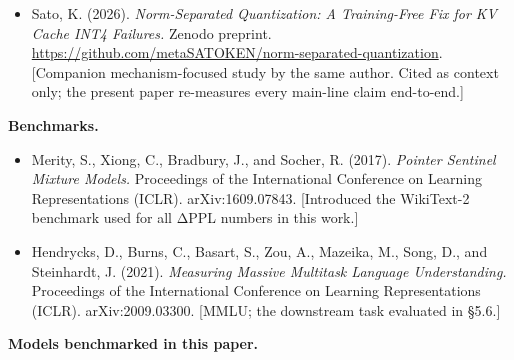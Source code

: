 \begin{itemize}
\tightlist
\item
  Sato, K. (2026). \emph{Norm-Separated Quantization: A Training-Free
  Fix for KV Cache INT4 Failures.} Zenodo preprint.
  \url{https://github.com/metaSATOKEN/norm-separated-quantization}.
  {[}Companion mechanism-focused study by the same author. Cited as
  context only; the present paper re-measures every main-line claim
  end-to-end.{]}
\end{itemize}

\textbf{Benchmarks.}

\begin{itemize}
\tightlist
\item
  Merity, S., Xiong, C., Bradbury, J., and Socher, R. (2017).
  \emph{Pointer Sentinel Mixture Models.} Proceedings of the
  International Conference on Learning Representations (ICLR).
  arXiv:1609.07843. {[}Introduced the WikiText-2 benchmark used for all
  ΔPPL numbers in this work.{]}
\item
  Hendrycks, D., Burns, C., Basart, S., Zou, A., Mazeika, M., Song, D.,
  and Steinhardt, J. (2021). \emph{Measuring Massive Multitask Language
  Understanding.} Proceedings of the International Conference on
  Learning Representations (ICLR). arXiv:2009.03300. {[}MMLU; the
  downstream task evaluated in §5.6.{]}
\end{itemize}

\textbf{Models benchmarked in this paper.}

